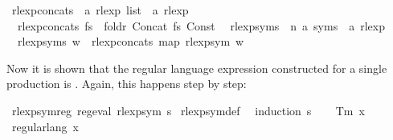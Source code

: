 \begin{isabellebody}
\ rlexp{\isacharunderscore}{\kern0pt}concats\ {\isacharcolon}{\kern0pt}{\isacharcolon}{\kern0pt}\ {\isachardoublequoteopen}{\isacharprime}{\kern0pt}a\ rlexp\ list\ {\isasymRightarrow}\ {\isacharprime}{\kern0pt}a\ rlexp{\isachardoublequoteclose}\ \isanewline
\ \ {\isachardoublequoteopen}rlexp{\isacharunderscore}{\kern0pt}concats\ fs\ {\isacharequal}{\kern0pt}\ foldr\ Concat\ fs\ {\isacharparenleft}{\kern0pt}Const\ {\isacharbraceleft}{\kern0pt}{\isacharbrackleft}{\kern0pt}{\isacharbrackright}{\kern0pt}{\isacharbraceright}{\kern0pt}{\isacharparenright}{\kern0pt}{\isachardoublequoteclose}\isanewline
\isanewline
{}\isamarkupfalse%
\ rlexp{\isacharunderscore}{\kern0pt}syms\ {\isacharcolon}{\kern0pt}{\isacharcolon}{\kern0pt}\ {\isachardoublequoteopen}{\isacharparenleft}{\kern0pt}{\isacharprime}{\kern0pt}n{\isacharcomma}{\kern0pt}\ {\isacharprime}{\kern0pt}a{\isacharparenright}{\kern0pt}\ syms\ {\isasymRightarrow}\ {\isacharprime}{\kern0pt}a\ rlexp{\isachardoublequoteclose}\ \isanewline
\ \ {\isachardoublequoteopen}rlexp{\isacharunderscore}{\kern0pt}syms\ w\ {\isacharequal}{\kern0pt}\ rlexp{\isacharunderscore}{\kern0pt}concats\ {\isacharparenleft}{\kern0pt}map\ rlexp{\isacharunderscore}{\kern0pt}sym\ w{\isacharparenright}{\kern0pt}{\isachardoublequoteclose}%
\begin{isamarkuptext}%
Now it is shown that the regular language expression constructed for a single production
is . Again, this happens step by step:%
\end{isamarkuptext}\isamarkuptrue%
\isamarkupfalse%
\ rlexp{\isacharunderscore}{\kern0pt}sym{\isacharunderscore}{\kern0pt}reg{\isacharcolon}{\kern0pt}\ {\isachardoublequoteopen}reg{\isacharunderscore}{\kern0pt}eval\ {\isacharparenleft}{\kern0pt}rlexp{\isacharunderscore}{\kern0pt}sym\ s{\isacharparenright}{\kern0pt}{\isachardoublequoteclose}\isanewline
%
\isadelimproof
%
\endisadelimproof
%
\isatagproof
{}\isamarkupfalse%
\ rlexp{\isacharunderscore}{\kern0pt}sym{\isacharunderscore}{\kern0pt}def\ \isamarkupfalse%
\ {\isacharparenleft}{\kern0pt}induction\ s{\isacharparenright}{\kern0pt}\isanewline
\ \ \isamarkupfalse%
\ {\isacharparenleft}{\kern0pt}Tm\ x{\isacharparenright}{\kern0pt}\isanewline
\ \ \isamarkupfalse%
\ {\isachardoublequoteopen}regular{\isacharunderscore}{\kern0pt}lang\ {\isacharbraceleft}{\kern0pt}{\isacharbrackleft}{\kern0pt}x{\isacharbrackright}{\kern0pt}{\isacharbraceright}{\kern0pt}{\isachardoublequoteclose}\ \isamarkupfalse%

\end{isabellebody}
